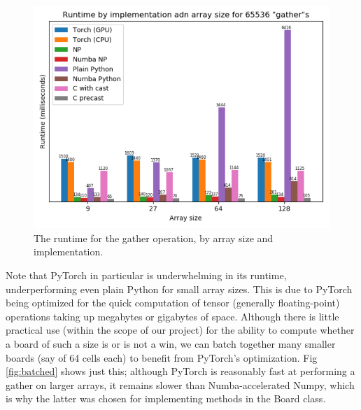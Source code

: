 \documentclass[12pt,a4paper]{article}
\begin{document}
\begin{figure}[!h]
	\centering
	\includegraphics[scale=.7]{./img/unbatched_full.png}
	\caption{The runtime for the gather operation, by array size and implementation.} \label{fig:unbatched}
\end{figure}

Note that PyTorch in particular is underwhelming in its runtime, underperforming even plain Python for small array sizes. This is due to PyTorch being optimized for the quick computation of tensor (generally floating-point) operations taking up megabytes or gigabytes of space. Although there is little practical use (within the scope of our project) for the ability to compute whether a board of such a size is or is not a win, we can batch together many smaller boards (say of 64 cells each) to benefit from PyTorch's optimization. Fig \ref{fig:batched} shows just this; although PyTorch is reasonably fast at performing a gather on larger arrays, it remains slower than Numba-accelerated Numpy, which is why the latter was chosen for implementing methods in the Board class.
\end{document}
